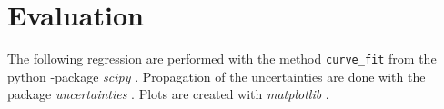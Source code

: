 \section{Evaluation}
\label{sec:auswertung}


The following regression are performed with the method \texttt{curve\_fit} from the python \cite{py}-package \textit{scipy} \cite{scipy}.
Propagation of the uncertainties are done with the package \textit{uncertainties} \cite{uncertainties}.
Plots are created with \textit{matplotlib} \cite{matplotlib}.
